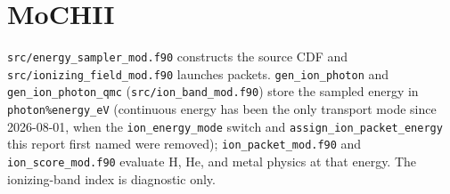 \documentclass[11pt]{my_memo}
\begin{document}
\section{MoCHII}
\texttt{src/energy\_\allowbreak sampler\_\allowbreak mod.f90} constructs the source CDF and \texttt{src/ionizing\_\allowbreak field\_\allowbreak mod.f90} launches packets.  \texttt{gen\_\allowbreak ion\_\allowbreak photon} and \texttt{gen\_\allowbreak ion\_\allowbreak photon\_\allowbreak qmc} (\texttt{src/ion\_\allowbreak band\_\allowbreak mod.f90}) store the sampled energy in \texttt{photon\%\allowbreak energy\_\allowbreak eV} (continuous energy has been the only transport mode since 2026-08-01, when the \texttt{ion\_\allowbreak energy\_\allowbreak mode} switch and \texttt{assign\_\allowbreak ion\_\allowbreak packet\_\allowbreak energy} this report first named were removed); \texttt{ion\_\allowbreak packet\_\allowbreak mod.f90} and \texttt{ion\_\allowbreak score\_\allowbreak mod.f90} evaluate H, He, and metal physics at that energy.  The ionizing-band index is diagnostic only.
\end{document}

